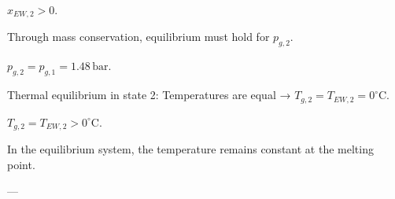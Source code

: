 \( x_{EW,2} > 0 \).  

Through mass conservation, equilibrium must hold for \( p_{g,2} \).  

\( p_{g,2} = p_{g,1} = 1.48 \, \text{bar} \).  

Thermal equilibrium in state 2:  
Temperatures are equal → \( T_{g,2} = T_{EW,2} = 0^\circ \text{C} \).  

\( T_{g,2} = T_{EW,2} > 0^\circ \text{C} \).  

In the equilibrium system, the temperature remains constant at the melting point.  

---